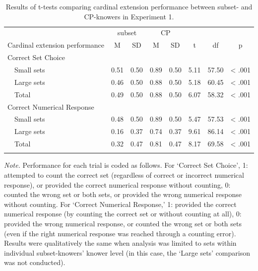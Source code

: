 \documentclass[
  man,floatsintext]{apa7}
\begin{document}
\begin{table}[tbp]

\begin{center}
\begin{threeparttable}

\caption{\label{tab:table1}Results of t-tests comparing cardinal extension performance between subset- and CP-knowers in Experiment 1.}

\begin{tabular}{llllllll}
\toprule
 & \multicolumn{2}{c}{subset} & \multicolumn{2}{c}{CP}  &  &  &\\
\cmidrule(r){2-3} \cmidrule(r){4-5}
Cardinal extension performance & \multicolumn{1}{c}{M} & \multicolumn{1}{c}{SD} & \multicolumn{1}{c}{M} & \multicolumn{1}{c}{SD} & \multicolumn{1}{c}{t} & \multicolumn{1}{c}{df} & \multicolumn{1}{c}{p}\\
\midrule
Correct Set Choice &  &  &  &  &  &  & \\
\ \ Small sets & 0.51 & 0.50 & 0.89 & 0.50 & 5.11 & 57.50 & < .001\\
\ \ Large sets & 0.46 & 0.50 & 0.88 & 0.50 & 5.18 & 60.45 & < .001\\
\ \ Total & 0.49 & 0.50 & 0.88 & 0.50 & 6.07 & 58.32 & < .001\\
Correct Numerical Response &  &  &  &  &  &  & \\
\ \ Small sets & 0.48 & 0.50 & 0.89 & 0.50 & 5.47 & 57.53 & < .001\\
\ \ Large sets & 0.16 & 0.37 & 0.74 & 0.37 & 9.61 & 86.14 & < .001\\
\ \ Total & 0.32 & 0.47 & 0.81 & 0.47 & 8.17 & 69.58 & < .001\\
\bottomrule
\addlinespace
\end{tabular}

\begin{tablenotes}[para]
\normalsize{\textit{Note.} Performance for each trial is coded as follows. For ‘Correct Set Choice’, 1: attempted to count the correct set (regardless of correct or incorrect numerical response), or provided the correct numerical response without counting, 0: counted the wrong set or both sets, or provided the wrong numerical response without counting. For ‘Correct Numerical Response,’ 1: provided the correct numerical response (by counting the correct set or without counting at all), 0: provided the wrong numerical response, or counted the wrong set or both sets (even if the right numerical response was reached through a counting error). Results were qualitatively the same when analysis was limited to sets within individual subset-knowers’ knower level (in this case, the ‘Large sets’ comparison was not conducted).}
\end{tablenotes}

\end{threeparttable}
\end{center}

\end{table}
\end{document}
